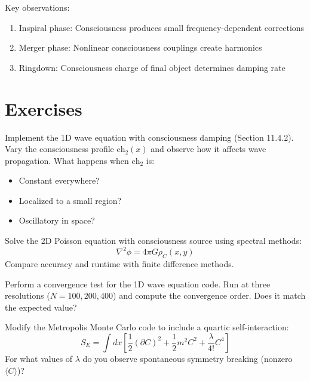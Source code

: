 Key observations:
\begin{enumerate}
\item Inspiral phase: Consciousness produces small frequency-dependent corrections
\item Merger phase: Nonlinear consciousness couplings create harmonics
\item Ringdown: Consciousness charge of final object determines damping rate
\end{enumerate}

\section{Exercises}

\begin{exercise}
Implement the 1D wave equation with consciousness damping (Section 11.4.2). Vary the consciousness profile $\text{ch}_2(x)$ and observe how it affects wave propagation. What happens when $\text{ch}_2$ is:
\begin{itemize}
\item Constant everywhere?
\item Localized to a small region?
\item Oscillatory in space?
\end{itemize}
\end{exercise}

\begin{exercise}
Solve the 2D Poisson equation with consciousness source using spectral methods:
\begin{equation}
\nabla^2 \phi = 4\pi G \rho_C(x, y)
\end{equation}
Compare accuracy and runtime with finite difference methods.
\end{exercise}

\begin{exercise}
Perform a convergence test for the 1D wave equation code. Run at three resolutions ($N = 100, 200, 400$) and compute the convergence order. Does it match the expected value?
\end{exercise}

\begin{exercise}
Modify the Metropolis Monte Carlo code to include a quartic self-interaction:
\begin{equation}
S_E = \int dx \left[ \frac{1}{2}(\partial C)^2 + \frac{1}{2}m^2 C^2 + \frac{\lambda}{4!}C^4 \right]
\end{equation}
For what values of $\lambda$ do you observe spontaneous symmetry breaking (nonzero $\langle C \rangle$)?
\end{exercise}

